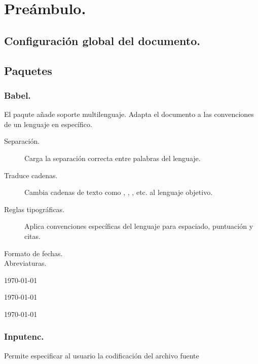 \chapter{Preámbulo.}

\section{Configuración global del documento.}


\section{Paquetes}

	\subsection{Babel.}
	
	El paqute  añade soporte multilenguaje. Adapta el documento a las convenciones de un lenguaje en específico.
	
	\begin{description}
		\item[Separación.] Carga la separación correcta entre palabras del lenguaje.
		\item[Traduce cadenas.] Cambia cadenas de texto como , , , etc. al lenguaje objetivo.
		\item[Reglas tipográficas.] Aplica convenciones específicas del lenguaje para espaciado, puntuación y citas.
		\item[Formato de fechas.]
		\item[Abreviaturas.]
	\end{description}
	
		\chaptername	
	\today
	
	\chaptername	
	\today
	\begin{otherlanguage}{english}
		\today
	\end{otherlanguage}
	
	
	\subsection{Inputenc.}
	
	Permite especificar al usuario la codificación del archivo fuente
	
